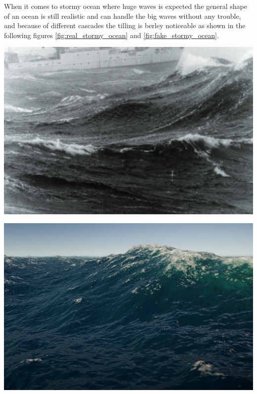When it comes to stormy ocean where huge waves is expected the general shape of an ocean is still realistic
and can handle the big waves without any trouble, and because of different cascades the tilling is berley noticeable as shown in the following figures \ref{fig:real_stormy_ocean} and \ref{fig:fake_stormy_ocean}.

\begin{minipage}[t]{0.48\textwidth}
    \centering
    \includegraphics[width=1\textwidth]{"images/real_stormy_ocean.png"}
    \captionsetup{justification=centering}
    \label{fig:real_stormy_ocean}
\end{minipage}
\hfill
\begin{minipage}[t]{0.48\textwidth}
    \centering
    \includegraphics[width=1\textwidth]{"images/fake_stormy_ocean.png"}
    \label{fig:fake_stormy_ocean}
\end{minipage}

